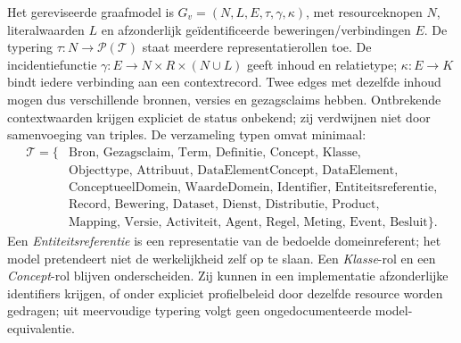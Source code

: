 Het gereviseerde graafmodel is $G_v=(N,L,E,\tau,\gamma,\kappa)$, met resourceknopen $N$, literalwaarden $L$ en afzonderlijk geïdentificeerde beweringen/verbindingen $E$. De typering $\tau:N\rightarrow\mathcal{P}(\mathcal{T})$ staat meerdere representatierollen toe. De incidentiefunctie $\gamma:E\rightarrow N\times R\times(N\cup L)$ geeft inhoud en relatietype; $\kappa:E\rightarrow K$ bindt iedere verbinding aan een contextrecord. Twee edges met dezelfde inhoud mogen dus verschillende bronnen, versies en gezagsclaims hebben. Ontbrekende contextwaarden krijgen expliciet de status onbekend; zij verdwijnen niet door samenvoeging van triples. De verzameling typen omvat minimaal:
\begin{align*}
\mathcal{T}=\{&\text{Bron, Gezagsclaim, Term, Definitie, Concept, Klasse,}\\
&\text{Objecttype, Attribuut, DataElementConcept, DataElement,}\\
&\text{ConceptueelDomein, WaardeDomein, Identifier, Entiteitsreferentie,}\\
&\text{Record, Bewering, Dataset, Dienst, Distributie, Product,}\\
&\text{Mapping, Versie, Activiteit, Agent, Regel, Meting, Event, Besluit}\}.
\end{align*}
Een \emph{Entiteitsreferentie} is een representatie van de bedoelde domeinreferent; het model pretendeert niet de werkelijkheid zelf op te slaan. Een \emph{Klasse}-rol en een \emph{Concept}-rol blijven onderscheiden. Zij kunnen in een implementatie afzonderlijke identifiers krijgen, of onder expliciet profielbeleid door dezelfde resource worden gedragen; uit meervoudige typering volgt geen ongedocumenteerde model-equivalentie.


